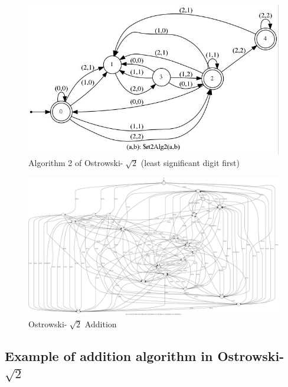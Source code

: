 \documentclass[a4paper]{article}
\begin{document}
\begin{figure}[h]
	\centering
    \includegraphics[width=0.6\columnwidth]{rt2Alg2_gv.jpg}
    \caption{Algorithm 2 of Ostrowski-$\sqrt[~]{2}$ (least significant digit first)}
    \label{fig:rt2_alg2}
\end{figure}
\begin{figure}[h]
	\centering
    \includegraphics[width=\columnwidth]{lsd_rt2_addition_gv.jpg}
    \caption{Ostrowski-$\sqrt[~]{2}$ Addition}
    \label{fig:rt2_addition}
\end{figure}



\subsection{Example of addition algorithm in Ostrowski-$\sqrt{2}$}
\end{document}
